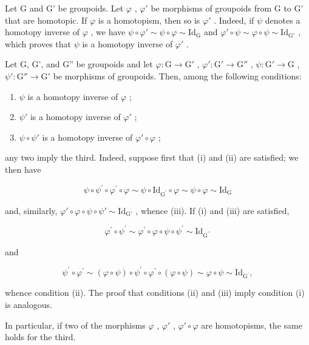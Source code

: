 Let G and G' be groupoids. Let \(\varphi\) , \(\varphi'\) be morphisms of groupoids from G to G' that are homotopic. If \(\varphi\) is a homotopism, then so is \(\varphi'\) . Indeed, if \(\psi\) denotes a homotopy inverse of \(\varphi\) , we have \(\psi \circ \varphi' \sim \psi \circ \varphi \sim \mathrm{Id}_{\mathrm{G}}\) and \(\varphi' \circ \psi \sim \varphi \circ \psi \sim \mathrm{Id}_{\mathrm{G}'}\) , which proves that \(\psi\) is a homotopy inverse of \(\varphi'\) .

Let G, G', and G'' be groupoids and let \(\varphi\colon\mathrm{G}\to\mathrm{G}'\) , \(\varphi'\colon\mathrm{G}'\to\mathrm{G}''\) , \(\psi\colon\mathrm{G}'\to\mathrm{G}\) , \(\psi'\colon\mathrm{G}''\to\mathrm{G}'\) be morphisms of groupoids. Then, among the following conditions:

\begin{enumerate}
\def\labelenumi{(\roman{enumi})}
\item
  \(\psi\) is a homotopy inverse of \(\varphi\) ;
\item
  \(\psi'\) is a homotopy inverse of \(\varphi'\) ;
\item
  \(\psi \circ \psi'\) is a homotopy inverse of \(\varphi' \circ \varphi\) ;
\end{enumerate}

any two imply the third. Indeed, suppose first that (i) and (ii) are satisfied; we then have

\[
\psi \circ \psi^ {\prime} \circ \varphi^ {\prime} \circ \varphi \sim \psi \circ \mathrm{Id} _ {\mathrm{G} ^ {\prime}} \circ \varphi \sim \psi \circ \varphi \sim \mathrm{Id} _ {\mathrm{G}}
\]

and, similarly, \(\varphi' \circ \varphi \circ \psi \circ \psi' \sim \mathrm{Id}_{\mathrm{G}'}\) , whence (iii). If (i) and (iii) are satisfied,

\[
\varphi^ {\prime} \circ \psi^ {\prime} \sim \varphi^ {\prime} \circ \varphi \circ \psi \circ \psi^ {\prime} \sim \mathrm{Id} _ {\mathrm{G} ^ {\prime \prime}}
\]

and

\[
\psi^ {\prime} \circ \varphi^ {\prime} \sim (\varphi \circ \psi) \circ \psi^ {\prime} \circ \varphi^ {\prime} \circ (\varphi \circ \psi) \sim \varphi \circ \psi \sim \mathrm{Id} _ {\mathrm{G} ^ {\prime}},
\]

whence condition (ii). The proof that conditions (ii) and (iii) imply condition (i) is analogous.

In particular, if two of the morphisms \(\varphi\) , \(\varphi'\) , \(\varphi'\circ\varphi\) are homotopisms, the same holds for the third.

